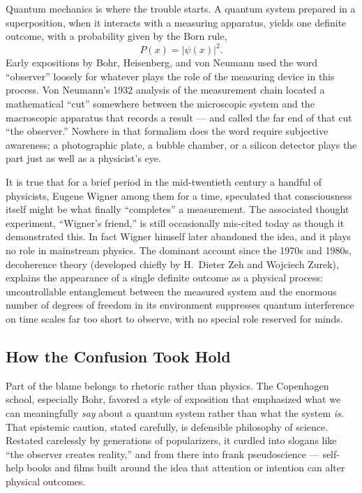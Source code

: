 Quantum mechanics is where the trouble starts. A quantum system prepared in
a superposition, when it interacts with a measuring apparatus, yields one
definite outcome, with a probability given by the Born rule,
\begin{equation}
  P(x) = |\psi(x)|^2 .
\end{equation}
Early expositions by Bohr, Heisenberg, and von Neumann used the word
``observer'' loosely for whatever plays the role of the measuring device in
this process. Von Neumann's 1932 analysis of the measurement chain located
a mathematical ``cut'' somewhere between the microscopic system and the
macroscopic apparatus that records a result --- and called the far end of
that cut ``the observer.'' Nowhere in that formalism does the word require
subjective awareness; a photographic plate, a bubble chamber, or a silicon
detector plays the part just as well as a physicist's eye.

It is true that for a brief period in the mid-twentieth century a handful of
physicists, Eugene Wigner among them for a time, speculated that
consciousness itself might be what finally ``completes'' a measurement.
The associated thought experiment, ``Wigner's friend,'' is still
occasionally mis-cited today as though it demonstrated this. In fact Wigner
himself later abandoned the idea, and it plays no role in mainstream
physics. The dominant account since the 1970s and 1980s, decoherence
theory (developed chiefly by H.\ Dieter Zeh and Wojciech Zurek), explains
the appearance of a single definite outcome as a physical process:
uncontrollable entanglement between the measured system and the enormous
number of degrees of freedom in its environment suppresses quantum
interference on time scales far too short to observe, with no special
role reserved for minds.

\subsection{How the Confusion Took Hold}

Part of the blame belongs to rhetoric rather than physics. The Copenhagen
school, especially Bohr, favored a style of exposition that emphasized what
we can meaningfully \emph{say} about a quantum system rather than what the
system \emph{is}. That epistemic caution, stated carefully, is defensible
philosophy of science. Restated carelessly by generations of popularizers,
it curdled into slogans like ``the observer creates reality,'' and from
there into frank pseudoscience --- self-help books and films built around
the idea that attention or intention can alter physical outcomes.

